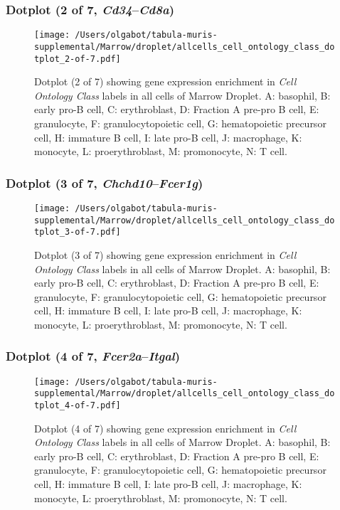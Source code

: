 \clearpage

\subsubsection{Dotplot (2 of 7, \emph{Cd34}--\emph{Cd8a})}
\begin{figure}[h]
\centering
\texttt{[image: /Users/olgabot/tabula-muris-supplemental/Marrow/droplet/allcells\_cell\_ontology\_class\_dotplot\_2-of-7.pdf]}

\caption{ Dotplot (2 of 7)  showing gene expression enrichment in \emph{Cell Ontology Class} labels in all cells of Marrow Droplet. A: basophil, B: early pro-B cell, C: erythroblast, D: Fraction A pre-pro B cell, E: granulocyte, F: granulocytopoietic cell, G: hematopoietic precursor cell, H: immature B cell, I: late pro-B cell, J: macrophage, K: monocyte, L: proerythroblast, M: promonocyte, N: T cell.}
\end{figure}


\clearpage

\subsubsection{Dotplot (3 of 7, \emph{Chchd10}--\emph{Fcer1g})}
\begin{figure}[h]
\centering
\texttt{[image: /Users/olgabot/tabula-muris-supplemental/Marrow/droplet/allcells\_cell\_ontology\_class\_dotplot\_3-of-7.pdf]}

\caption{ Dotplot (3 of 7)  showing gene expression enrichment in \emph{Cell Ontology Class} labels in all cells of Marrow Droplet. A: basophil, B: early pro-B cell, C: erythroblast, D: Fraction A pre-pro B cell, E: granulocyte, F: granulocytopoietic cell, G: hematopoietic precursor cell, H: immature B cell, I: late pro-B cell, J: macrophage, K: monocyte, L: proerythroblast, M: promonocyte, N: T cell.}
\end{figure}


\clearpage

\subsubsection{Dotplot (4 of 7, \emph{Fcer2a}--\emph{Itgal})}
\begin{figure}[h]
\centering
\texttt{[image: /Users/olgabot/tabula-muris-supplemental/Marrow/droplet/allcells\_cell\_ontology\_class\_dotplot\_4-of-7.pdf]}

\caption{ Dotplot (4 of 7)  showing gene expression enrichment in \emph{Cell Ontology Class} labels in all cells of Marrow Droplet. A: basophil, B: early pro-B cell, C: erythroblast, D: Fraction A pre-pro B cell, E: granulocyte, F: granulocytopoietic cell, G: hematopoietic precursor cell, H: immature B cell, I: late pro-B cell, J: macrophage, K: monocyte, L: proerythroblast, M: promonocyte, N: T cell.}
\end{figure}



